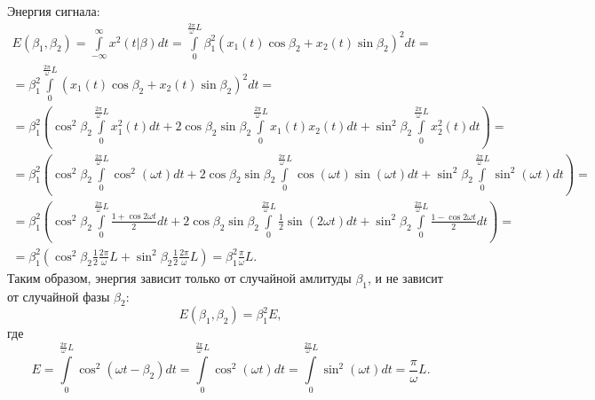 \documentclass[a4paper,12pt]{article}
\begin{document}
    Энергия сигнала:
    \begin{multline*}
        E(\beta_1, \beta_2)
        = \int \limits_{-\infty}^{\infty} x^2(t | \beta ) dt
        = \int \limits_{0}^{\frac{2 \pi}{\omega} L} \beta_1^2 \left ( x_1(t) \cos \beta_2 + x_2(t) \sin \beta_2 \right )^2 dt = \\
        = \beta_1^2 \int \limits_{0}^{\frac{2 \pi}{\omega} L} \left ( x_1(t) \cos \beta_2 + x_2(t) \sin \beta_2 \right )^2 dt = \\
        = \beta_1^2 \left (
        \cos^2 \beta_2 \int \limits_{0}^{\frac{2 \pi}{\omega} L} x_1^2(t) dt
        + 2 \cos \beta_2 \sin \beta_2 \int \limits_{0}^{\frac{2 \pi}{\omega} L} x_1(t) x_2(t) dt
        + \sin^2 \beta_2 \int \limits_{0}^{\frac{2 \pi}{\omega} L} x_2^2(t) dt
        \right ) = \\
        = \beta_1^2 \left (
        \cos^2 \beta_2 \int \limits_{0}^{\frac{2 \pi}{\omega} L} \cos^2 (\omega t) dt
        + 2 \cos \beta_2 \sin \beta_2 \int \limits_{0}^{\frac{2 \pi}{\omega} L} \cos (\omega t) \sin (\omega t) dt
        + \sin^2 \beta_2 \int \limits_{0}^{\frac{2 \pi}{\omega} L} \sin^2 (\omega t) dt
        \right ) = \\
        = \beta_1^2 \left (
        \cos^2 \beta_2 \int \limits_{0}^{\frac{2 \pi}{\omega} L} \frac{1 + \cos 2 \omega t }{2} dt
        + 2 \cos \beta_2 \sin \beta_2 \int \limits_{0}^{\frac{2 \pi}{\omega} L} \frac{1}{2} \sin (2 \omega t) dt
        + \sin^2 \beta_2 \int \limits_{0}^{\frac{2 \pi}{\omega} L} \frac{1 - \cos 2 \omega t}{2} dt
        \right ) = \\
        = \beta_1^2 \left ( \cos^2 \beta_2 \frac{1}{2} \frac{2 \pi}{\omega} L + \sin^2 \beta_2 \frac{1}{2} \frac{2 \pi}{\omega} L \right )
        = \beta_1^2 \frac{\pi}{\omega} L .
    \end{multline*}
    Таким образом, энергия зависит только от случайной амлитуды $\beta_1$, и не зависит от случайной фазы $\beta_2$:
    \[
        E(\beta_1, \beta_2) = \beta_1^2 E,
    \]
    где
    \[
        E
        = \int \limits_{0}^{\frac{2 \pi}{\omega} L} \cos^2 \left ( \omega t - \beta_2 \right ) dt
        = \int \limits_{0}^{\frac{2 \pi}{\omega} L} \cos^2 \left ( \omega t \right ) dt
        = \int \limits_{0}^{\frac{2 \pi}{\omega} L} \sin^2 \left ( \omega t \right ) dt
        = \frac{\pi}{\omega} L
        .
    \]
\end{document}
